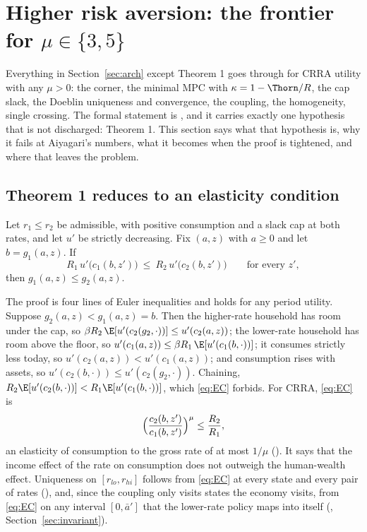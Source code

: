 \section{Higher risk aversion: the frontier for \texorpdfstring{$\mu\in\{3,5\}$}{mu = 3, 5}}
\label{sec:beyond}

Everything in Section~\ref{sec:arch} except Theorem 1 goes through for CRRA utility with any
$\mu>0$: the corner, the minimal MPC with $\kappa=1-\Thorn/R$, the cap slack, the Doeblin
uniqueness and convergence, the coupling, the homogeneity, single crossing. The formal statement is
, and it carries exactly one hypothesis that is
not discharged: Theorem 1. This section says what that hypothesis is, why it fails at Aiyagari's
numbers, what it becomes when the proof is tightened, and where that leaves the problem.

\subsection{Theorem 1 reduces to an elasticity condition}\label{sec:elasticity}

\begin{proposition}\label{prop:elas}
Let $r_1\le r_2$ be admissible, with positive consumption and a slack cap at both rates, and let
$u'$ be strictly decreasing. Fix $(a,z)$ with $a\ge0$ and let $b=g_1(a,z)$. If
\begin{equation}\label{eq:EC}
  R_1\,u'\bigl(c_1(b,z')\bigr)\ \le\ R_2\,u'\bigl(c_2(b,z')\bigr)\qquad\text{for every }z',
\end{equation}
then $g_1(a,z)\le g_2(a,z)$.
\end{proposition}

The proof is four lines of Euler inequalities and holds for any period utility. Suppose
$g_2(a,z)<g_1(a,z)=b$. Then the higher-rate household has room under the cap, so
$\beta R_2\,\E[u'(c_2(g_2,\cdot))]\le u'(c_2(a,z))$; the lower-rate household has room above the
floor, so $u'(c_1(a,z))\le\beta R_1\,\E[u'(c_1(b,\cdot))]$; it consumes strictly less today, so
$u'(c_2(a,z))<u'(c_1(a,z))$; and consumption rises with assets, so
$u'(c_2(b,\cdot))\le u'(c_2(g_2,\cdot))$. Chaining, $R_2\E[u'(c_2(b,\cdot))]<R_1\E[u'(c_1(b,\cdot))]$,
which \eqref{eq:EC} forbids. For CRRA, \eqref{eq:EC} is
\[
  \Bigl(\frac{c_2(b,z')}{c_1(b,z')}\Bigr)^{\mu}\le\frac{R_2}{R_1},
\]
an elasticity of consumption to the gross rate of at most $1/\mu$ ().
It says that the income effect of the rate on consumption does not outweigh the human-wealth
effect. Uniqueness on $[r_{lo},r_{hi}]$ follows from \eqref{eq:EC} at every state and every pair of
rates (), and, since the coupling only visits
states the economy visits, from \eqref{eq:EC} on any interval $[0,\bar a']$ that the lower-rate
policy maps into itself (,
Section~\ref{sec:invariant}).


